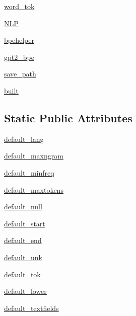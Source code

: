 \begin{DoxyCompactItemize}
\item 
\hyperlink{classparlai_1_1core_1_1dict_1_1DictionaryAgent_a025ffc815b72c6d2d34c12249956d4f1}{word\+\_\+tok}
\item 
\hyperlink{classparlai_1_1core_1_1dict_1_1DictionaryAgent_a8f4fbeb1e3a220c70e2828e4ce9c3f51}{N\+LP}
\item 
\hyperlink{classparlai_1_1core_1_1dict_1_1DictionaryAgent_af2bfd8d00b4733c085a639521e727ceb}{bpehelper}
\item 
\hyperlink{classparlai_1_1core_1_1dict_1_1DictionaryAgent_ac0fbaa96f4b3d1cef6628da8320d4bc2}{gpt2\+\_\+bpe}
\item 
\hyperlink{classparlai_1_1core_1_1dict_1_1DictionaryAgent_a98faac965437d58fd2bf59f9d1438272}{save\+\_\+path}
\item 
\hyperlink{classparlai_1_1core_1_1dict_1_1DictionaryAgent_a3917720c8b31e5b99698beca63256511}{built}
\end{DoxyCompactItemize}
\subsection*{Static Public Attributes}
\begin{DoxyCompactItemize}
\item 
\hyperlink{classparlai_1_1core_1_1dict_1_1DictionaryAgent_abaf912ab6b433d48cfc156218276f926}{default\+\_\+lang}
\item 
\hyperlink{classparlai_1_1core_1_1dict_1_1DictionaryAgent_a3ba85d9c9f522fd7d14790ab7e228225}{default\+\_\+maxngram}
\item 
\hyperlink{classparlai_1_1core_1_1dict_1_1DictionaryAgent_a798ee55bfd917cbf5d2ac766123f16ca}{default\+\_\+minfreq}
\item 
\hyperlink{classparlai_1_1core_1_1dict_1_1DictionaryAgent_aeddaf81e54e344ddfd8ad1b59a786a7c}{default\+\_\+maxtokens}
\item 
\hyperlink{classparlai_1_1core_1_1dict_1_1DictionaryAgent_a056841f6e5531fac1d6e06125e8578c2}{default\+\_\+null}
\item 
\hyperlink{classparlai_1_1core_1_1dict_1_1DictionaryAgent_ab83c2273d1eb86c7bce9c5c3c1866bcb}{default\+\_\+start}
\item 
\hyperlink{classparlai_1_1core_1_1dict_1_1DictionaryAgent_a93744f41c5a1bbdb57c2c0bec9e08496}{default\+\_\+end}
\item 
\hyperlink{classparlai_1_1core_1_1dict_1_1DictionaryAgent_ac60a2c20d7693d14e175032d5185e784}{default\+\_\+unk}
\item 
\hyperlink{classparlai_1_1core_1_1dict_1_1DictionaryAgent_a554fce05a3a164879cc64a597ce8c5bb}{default\+\_\+tok}
\item 
\hyperlink{classparlai_1_1core_1_1dict_1_1DictionaryAgent_a59b9ea9bced9ca0a4272e9b5fa93d23b}{default\+\_\+lower}
\item 
\hyperlink{classparlai_1_1core_1_1dict_1_1DictionaryAgent_aa5b59f6cb7615cf32c6372f365710ce7}{default\+\_\+textfields}
\end{DoxyCompactItemize}


